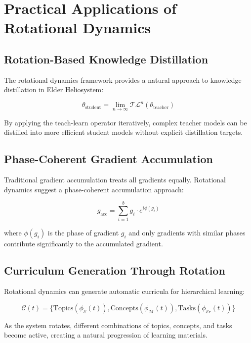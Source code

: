 \section{Practical Applications of Rotational Dynamics}

\subsection{Rotation-Based Knowledge Distillation}

The rotational dynamics framework provides a natural approach to knowledge distillation in Elder Heliosystem:

\begin{equation}
\theta_{\text{student}} = \lim_{n \rightarrow \infty} \mathcal{TL}^n(\theta_{\text{teacher}})
\end{equation}

By applying the teach-learn operator iteratively, complex teacher models can be distilled into more efficient student models without explicit distillation targets.

\subsection{Phase-Coherent Gradient Accumulation}

Traditional gradient accumulation treats all gradients equally. Rotational dynamics suggest a phase-coherent accumulation approach:

\begin{equation}
g_{\text{acc}} = \sum_{i=1}^b g_i \cdot e^{i\phi(g_i)}
\end{equation}

where $\phi(g_i)$ is the phase of gradient $g_i$ and only gradients with similar phases contribute significantly to the accumulated gradient.

\subsection{Curriculum Generation Through Rotation}

Rotational dynamics can generate automatic curricula for hierarchical learning:

\begin{equation}
\mathcal{C}(t) = \{\text{Topics}(\phi_{\mathcal{E}}(t)), \text{Concepts}(\phi_{\mathcal{M}}(t)), \text{Tasks}(\phi_{\mathcal{E}r}(t))\}
\end{equation}

As the system rotates, different combinations of topics, concepts, and tasks become active, creating a natural progression of learning materials.

